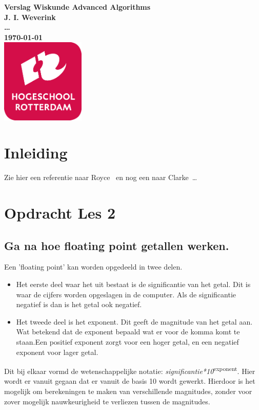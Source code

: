 \documentclass{article}%
\begin{document}
\sffamily
\begin{titlepage}
  \centering
    \vfill
    {\bfseries\Huge
      Verslag Wiskunde Advanced Algorithms \\
        \vskip2cm
      }
      {\bfseries\Large
        J. I. Weverink\\
      }
      {
        \bfseries\normalsize
        \ldots\\
        \vskip1cm
        \today\\
    }    
    \vfill
    \includegraphics[width=4cm]{pictures/logohr.png} %
    \vfill
    \vfill
\end{titlepage}
\newpage
\tableofcontents

\newpage
\section{Inleiding}
Zie hier een referentie naar Royce~\cite{royce1987managing} en nog een naar Clarke~\cite{modelchecking}\ldots 

\clearpage

\section{Opdracht Les 2}

\subsection{\normalsize{Ga na hoe floating point getallen werken.}}
Een 'floating point' kan worden opgedeeld in twee delen.
\begin{itemize}
\item Het eerste deel waar het uit bestaat is de significantie van het getal. Dit is waar de cijfers worden opgeslagen in de computer. Als de significantie negatief is dan is het getal ook negatief.

\item Het tweede deel is het exponent. Dit geeft de magnitude van het getal aan. Wat betekend dat de exponent bepaald wat er voor de komma komt te staan.Een positief exponent zorgt voor een hoger getal, en een negatief exponent voor lager getal.
\end{itemize}
Dit bij elkaar vormd de wetenschappelijke notatie: \small{\textit{significantie*10}\normalsize{\textsuperscript{exponent}}}. Hier wordt er vanuit gegaan dat er vanuit de basis 10 wordt gewerkt. Hierdoor is het mogelijk om berekeningen te maken van verschillende magnitudes, zonder voor zover mogelijk nauwkeurigheid te verliezen tussen de magnitudes.
\end{document}
